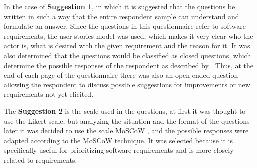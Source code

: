 In the case of \textbf{Suggestion 1}, in which it is suggested that the questions be written in such a way that the entire respondent sample can understand and formulate an answer.
Since the questions in this questionnaire refer to software requirements, the user stories model was used, which makes it very clear who the actor is, what is desired with the given requirement and the reason for it.
It was also determined that the questions would be classified as closed questions, which determine the possible responses of the respondent as described by .
Thus, at the end of each page of the questionnaire there was also an open-ended question allowing the respondent to discuss possible suggestions for improvements or new requirements not yet elicited.


The \textbf{Suggestion 2} is the scale used in the questions, at first it was thought to use the Likert scale, but analyzing the situation and the format of the questions later it was decided to use the scale \ac{MoSCoW} , and the possible responses were adapted according to the MoSCoW technique.
It was selected because it is specifically useful for prioritizing software requirements and is more closely related to requirements.


